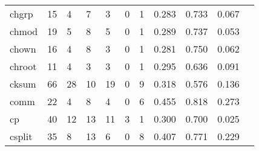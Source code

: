 \begin{longtable}{lp{1.10cm}p{1.10cm}p{1.10cm}p{1.10cm}p{1.10cm}p{1.10cm}p{1.10cm}p{1.10cm}p{1.10cm}p{1.10cm}}
chgrp     &                     15 &                                  4 &                                 7 &                                3 &                                 0 &                               1 &                          0.283 &                                 0.733 &                               0.067 \\
chmod     &                     19 &                                  5 &                                 8 &                                5 &                                 0 &                               1 &                          0.289 &                                 0.737 &                               0.053 \\
chown     &                     16 &                                  4 &                                 8 &                                3 &                                 0 &                               1 &                          0.281 &                                 0.750 &                               0.062 \\
chroot    &                     11 &                                  4 &                                 3 &                                3 &                                 0 &                               1 &                          0.295 &                                 0.636 &                               0.091 \\
cksum     &                     66 &                                 28 &                                10 &                               19 &                                 0 &                               9 &                          0.318 &                                 0.576 &                               0.136 \\
comm      &                     22 &                                  4 &                                 8 &                                4 &                                 0 &                               6 &                          0.455 &                                 0.818 &                               0.273 \\
cp        &                     40 &                                 12 &                                13 &                               11 &                                 3 &                               1 &                          0.300 &                                 0.700 &                               0.025 \\
csplit    &                     35 &                                  8 &                                13 &                                6 &                                 0 &                               8 &                          0.407 &                                 0.771 &                               0.229 \\

\end{longtable}
